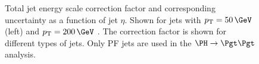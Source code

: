 \begin{figure}
\begin{center}

\end{center}
\caption[Total jet energy scale correction factor and corresponding uncertainty
as a function of jet $\eta$.]{
Total jet energy scale correction factor and corresponding uncertainty
as a function of jet $\eta$. Shown for jets with $\pt=50\,\GeV$ (left) and
$\pt=200\,\GeV$ \cite{CMS-JME-10-011}. The correction factor is shown for
different types of jets. Only \ac{PF} jets are used in the $\HToTauTau$
analysis.      
}
\label{fig:jesuncert}
\end{figure}

